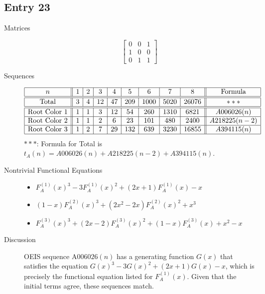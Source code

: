 \documentclass[12pt]{amsart}
\newcommand{\gff}[2]{F_{#2}^{(#1)}(x)}
\newcommand{\gfa}[1]{\gff{#1}{A}}
\begin{document}
\subsection*{Entry 23}
\begin{description}
    \item[Matrices]
    
    \[\begin{bmatrix}
0 & 0 & 1 \\
1 & 0 & 0 \\
0 & 1 & 1
\end{bmatrix}\]
    \item[Sequences]\hspace*{\fill}\vspace{-0.5cm}
    \begin{center}
        \[
        \begin{array}{|c||c|c|c|c|c|c|c|c||c|}\hline
           n  & 1 & 2 & 3 & 4 & 5 & 6 & 7 & 8  & \text{Formula}\\\hline\hline
           \text{Total}  & 3 & 4 & 12 & 47 & 209 & 1000 & 5020 & 26076 & *** \\\hline\hline
           \text{Root Color }1 & 1 & 1 & 3 & 12 & 54 & 260 & 1310 & 6821 & A006026(n)\\\hline
           \text{Root Color }2 & 1 & 1 & 2 & 6 & 23 & 101 & 480 & 2400 & A218225(n-2)\\\hline
           \text{Root Color }3 & 1 & 2 & 7 & 29 & 132 & 639 & 3230 & 16855 & A394115(n)\\\hline
        \end{array}
        \]
        $***$: Formula for Total is $t_A(n)=A006026(n) + A218225(n-2) + A394115(n)$.
    \end{center}
    
    \item[Nontrivial Functional Equations]\hspace*{\fill}

    \begin{itemize}
\item $\gfa{1}^3-3\gfa{1}^2+(2x + 1)\gfa{1}-x$

\item $(1 - x)\gfa{2}^3+(2x^2 - 2x)\gfa{2}^2+x^3$

\item $\gfa{3}^3+(2x - 2)\gfa{3}^2+(1 - x)\gfa{3}+x^2 - x$

\end{itemize}
    \item[Discussion] OEIS sequence $\text{A006026}(n)$ has a generating function $G(x)$ that satisfies the equation $G(x)^3-3G(x)^2+\left(2x+1\right)G(x)-x$, which is precisely the functional equation listed for $\gfa{1}$. 
    Given that the initial terms agree, these sequences match.


\end{description}
\end{document}
